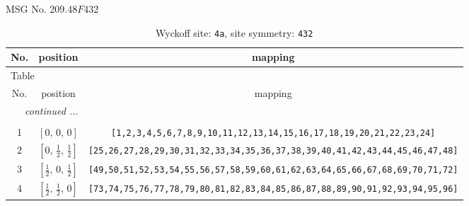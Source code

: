 \documentclass[fleqn,8pt]{jsarticle}
\begin{document}
\setcounter{MaxMatrixCols}{32}

\renewcommand{\tablename}{Table~}
\renewcommand{\figurename}{Figure~}
\begin{center}
\LARGE
MSG No. 209.48\quad$F432$
\end{center}
\renewcommand{\arraystretch}{1.2}
\begin{longtable}{ccc}
\caption{Wyckoff site: {\tt 4a}, site symmetry: {\tt 432}}
 \\
 \hline \hline
No. & position & mapping \\ \hline \endfirsthead

\multicolumn{2}{l}{\tablename\ \thetable{}} \\
 \hline \hline
No. & position & mapping \\ \hline \endhead

 \hline \hline
\multicolumn{2}{r}{\footnotesize\it continued ...} \\ \endfoot

 \hline \hline
\multicolumn{2}{r}{} \\ \endlastfoot

1 & $\left[ 0,\, 0,\, 0 \right]$ & {\tt [1,2,3,4,5,6,7,8,9,10,11,12,13,14,15,16,17,18,19,20,21,22,23,24]} \\ \hline
2 & $\left[ 0,\, \frac{1}{2},\, \frac{1}{2} \right]$ & {\tt [25,26,27,28,29,30,31,32,33,34,35,36,37,38,39,40,41,42,43,44,45,46,47,48]} \\ \hline
3 & $\left[ \frac{1}{2},\, 0,\, \frac{1}{2} \right]$ & {\tt [49,50,51,52,53,54,55,56,57,58,59,60,61,62,63,64,65,66,67,68,69,70,71,72]} \\ \hline
4 & $\left[ \frac{1}{2},\, \frac{1}{2},\, 0 \right]$ & {\tt [73,74,75,76,77,78,79,80,81,82,83,84,85,86,87,88,89,90,91,92,93,94,95,96]} \\
\end{longtable}
\renewcommand{\arraystretch}{1.2}
\end{document}
